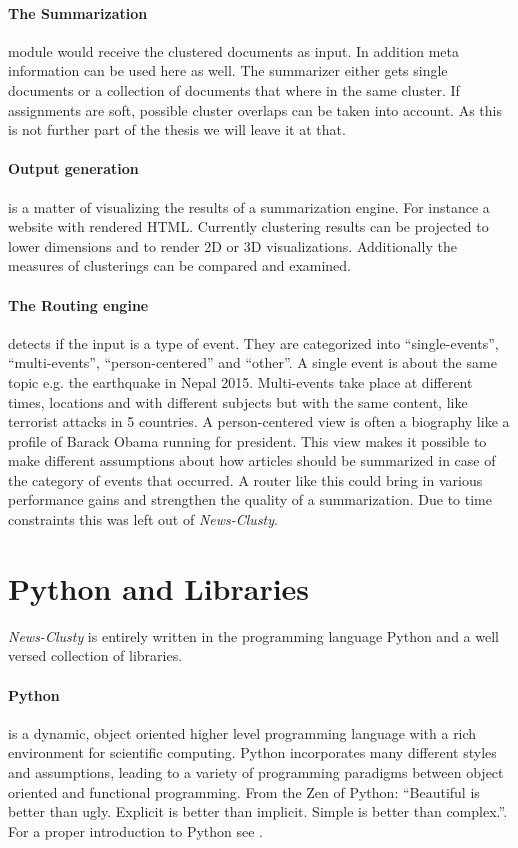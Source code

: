   \paragraph{The Summarization} module would receive the clustered documents as input. In addition meta information can be used here as well. The summarizer either gets single documents or a collection of documents that where in the same cluster. If assignments are soft, possible cluster overlaps can be taken into account. As this is not further part of the thesis we will leave it at that.

  \paragraph{Output generation} is a matter of visualizing the results of a summarization engine. For instance a website with rendered HTML. Currently clustering results can be projected to lower dimensions and to render 2D or 3D visualizations. Additionally the measures of clusterings can be compared and examined.

  \paragraph{The Routing engine} detects if the input is a type of event. They are categorized into ``single-events'', ``multi-events'', ``person-centered'' and ``other''. A single event is about the same topic e.g. the earthquake in Nepal 2015. Multi-events take place at different times, locations and with different subjects but with the same content, like terrorist attacks in 5 countries. A person-centered view is often a biography like a profile of Barack Obama running for president. This view makes it possible to make different assumptions about how articles should be summarized in case of the category of events that occurred. A router like this could bring in various performance gains and strengthen the quality of a summarization. Due to time constraints this was left out of \emph{News-Clusty}.

\section{Python and Libraries}
\label{sec:python_and_libraries}

  \emph{News-Clusty} is entirely written in the programming language Python and a well versed collection of libraries.

  \paragraph{Python} is a dynamic, object oriented higher level programming language with a rich environment for scientific computing. Python incorporates many different styles and assumptions, leading to a variety of programming paradigms between object oriented and functional programming. From the Zen of Python: ``Beautiful is better than ugly. Explicit is better than implicit. Simple is better than complex.''. For a proper introduction to Python see \cite{NltkPython}.


